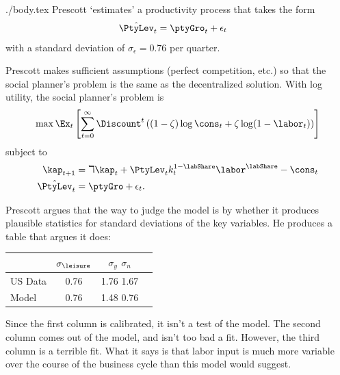\documentclass{handout}
\begin{document}
\begin{verbatimwrite}{./body.tex}
Prescott `estimates' a productivity process that takes the form
\begin{equation}\begin{gathered}\begin{aligned}
        \hat{\PtyLev}_{t} & =  \ptyGro_{t} + \epsilon_{t}
\end{aligned}\end{gathered}\end{equation}
with a standard deviation of $\sigma_{\epsilon} = 0.76$ per quarter.  

Prescott makes sufficient assumptions (perfect competition, etc.)  so
that the social planner's problem is the same as the decentralized
solution.  With log utility, the social planner's problem is
\begin{equation}
        \max \Ex_{t}\left[\sum_{t=0}^{\infty}\Discount^{t} \left((1-\zeta) \log \cons_{t} + \zeta \log (1-\labor_{t})\right)\right] \label{eq:objlog}
\end{equation}
subject to
\begin{equation}\begin{gathered}\begin{aligned}
        \kap_{t+1} & =  \daleth \kap_{t}+\PtyLev_{t}k^{1-\labShare}_{t}\labor^{\labShare} - \cons_{t}  \\
        \hat{\PtyLev}_{t} & =  \ptyGro + \epsilon_{t}.
\end{aligned}\end{gathered}\end{equation}

Prescott argues that the way to judge the model is by whether it
produces plausible statistics for standard deviations of the 
key variables.  He produces a table that argues it does:

\begin{table}[ht]
\center
\begin{tabular}{lccc}
                 & $\sigma_{\leisure }$  & $\sigma_{y}$   $\sigma_{n}$ \\ \hline
   US Data       & 0.76          & 1.76           1.67   
\\ Model         & 0.76          & 1.48           0.76
\end{tabular}
\end{table}

Since the first column is calibrated, it isn't a test of the model.  
The second column comes out of the model, and isn't too bad a fit.  
However, the third column is a terrible fit.  What it says is that 
labor input is much more variable over the course of the business 
cycle than this model would suggest.  


\end{verbatimwrite}
\end{document}
